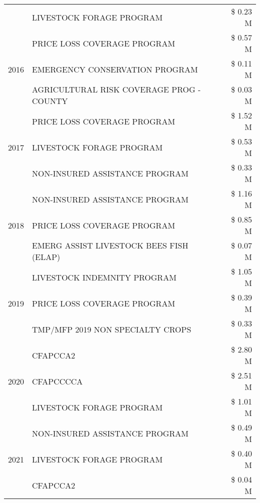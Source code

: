 \begin{tabular}{llr}
 & LIVESTOCK FORAGE PROGRAM & \$ 0.23 M \\
\cline{1-3}
\multirow[t]{3}{*}{2016} & PRICE LOSS COVERAGE PROGRAM & \$ 0.57 M \\
 & EMERGENCY CONSERVATION PROGRAM & \$ 0.11 M \\
 & AGRICULTURAL RISK COVERAGE PROG - COUNTY & \$ 0.03 M \\
\cline{1-3}
\multirow[t]{3}{*}{2017} & PRICE LOSS COVERAGE PROGRAM & \$ 1.52 M \\
 & LIVESTOCK FORAGE PROGRAM & \$ 0.53 M \\
 & NON-INSURED ASSISTANCE PROGRAM & \$ 0.33 M \\
\cline{1-3}
\multirow[t]{3}{*}{2018} & NON-INSURED ASSISTANCE PROGRAM & \$ 1.16 M \\
 & PRICE LOSS COVERAGE PROGRAM & \$ 0.85 M \\
 & EMERG ASSIST LIVESTOCK BEES FISH (ELAP) & \$ 0.07 M \\
\cline{1-3}
\multirow[t]{3}{*}{2019} & LIVESTOCK INDEMNITY PROGRAM & \$ 1.05 M \\
 & PRICE LOSS COVERAGE PROGRAM & \$ 0.39 M \\
 & TMP/MFP 2019 NON SPECIALTY CROPS & \$ 0.33 M \\
\cline{1-3}
\multirow[t]{3}{*}{2020} & CFAPCCA2 & \$ 2.80 M \\
 & CFAPCCCCA & \$ 2.51 M \\
 & LIVESTOCK FORAGE PROGRAM & \$ 1.01 M \\
\cline{1-3}
\multirow[t]{3}{*}{2021} & NON-INSURED ASSISTANCE PROGRAM & \$ 0.49 M \\
 & LIVESTOCK FORAGE PROGRAM & \$ 0.40 M \\
 & CFAPCCA2 & \$ 0.04 M \\
\cline{1-3}
\bottomrule
\end{tabular}
